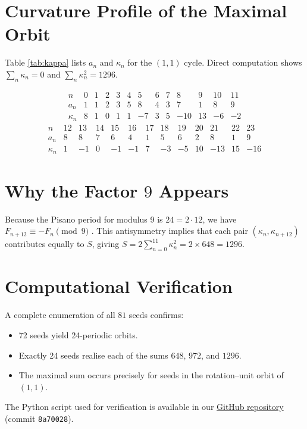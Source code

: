 \documentclass[12pt]{article}
\begin{document}
\section{Curvature Profile of the Maximal Orbit}

Table \ref{tab:kappa} lists $a_n$ and $\kappa_n$ for the $(1,1)$ cycle.
Direct computation shows $\sum_{n}\kappa_n=0$ and
\(\sum_{n}\kappa_n^{2}=1296\).

\begin{table}[h!]
\centering
\[
\begin{array}{c|cccccccccccc}
n & 0 & 1 & 2 & 3 & 4 & 5 & 6 & 7 & 8 & 9 & 10 & 11\\\hline
a_n & 1 & 1 & 2 & 3 & 5 & 8 & 4 & 3 & 7 & 1 & 8 & 9\\
\kappa_n & 8 & 1 & 0 & 1 & 1 & -7 & 3 & 5 & -10 & 13 & -6 & -2
\end{array}
\]
\[
\begin{array}{c|cccccccccccc}
n & 12 & 13 & 14 & 15 & 16 & 17 & 18 & 19 & 20 & 21 & 22 & 23\\\hline
a_n & 8 & 8 & 7 & 6 & 4 & 1 & 5 & 6 & 2 & 8 & 1 & 9\\
\kappa_n & 1 & -1 & 0 & -1 & -1 & 7 & -3 & -5 & 10 & -13 & 15 & -16
\end{array}
\]
\caption{Second differences for the $(1,1)$ orbit.}
\label{tab:kappa}
\end{table}

\section[Why the Factor 9 Appears]{Why the Factor $9$ Appears}

Because the Pisano period for modulus 9 is $24=2\cdot12$, we have
\(F_{n+12}\equiv-F_n\pmod9\) \cite{Wall1960}.  This antisymmetry implies that
each pair \((\kappa_n,\kappa_{n+12})\) contributes equally to $S$, giving
\(S=2\sum_{n=0}^{11}\kappa_n^{2}=2\times648=1296\).

\section{Computational Verification}

A complete enumeration of all $81$ seeds confirms:
\begin{itemize}
\item 72 seeds yield 24-periodic orbits.
\item Exactly 24 seeds realise each of the sums $648$, $972$, and $1296$.
\item The maximal sum occurs precisely for seeds in the rotation–unit orbit of
      $(1,1)$.
\end{itemize}
The Python script used for verification is available in our
\href{https://github.com/founder-guy/fibonacci-mod9-curvature}{GitHub repository}
(commit \texttt{8a70028}).
\end{document}
